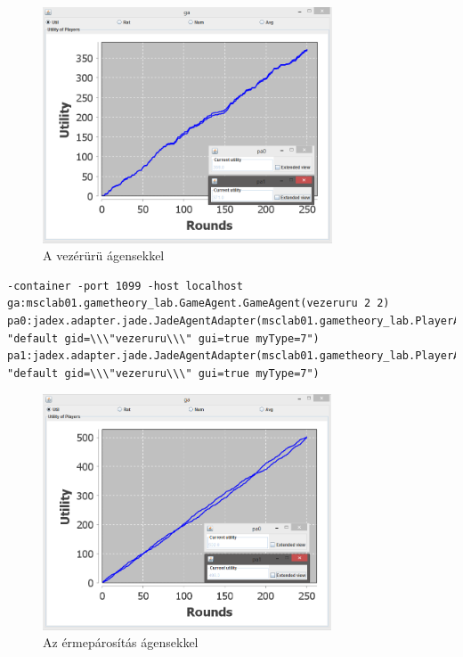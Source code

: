 		\begin{figure}[h]
		\begin{center}
		\includegraphics[height=7cm]{figures/uru_jadex.png}
		\caption{A vezérürü ágensekkel}
		\end{center}
		\end{figure}

\begin{lstlisting}[caption=Vezérürü run config, frame=single,float=!ht]
-container -port 1099 -host localhost 
ga:msclab01.gametheory_lab.GameAgent.GameAgent(vezeruru 2 2) pa0:jadex.adapter.jade.JadeAgentAdapter(msclab01.gametheory_lab.PlayerAgent.Player 
"default gid=\\\"vezeruru\\\" gui=true myType=7") 
pa1:jadex.adapter.jade.JadeAgentAdapter(msclab01.gametheory_lab.PlayerAgent.Player 
"default gid=\\\"vezeruru\\\" gui=true myType=7")
\end{lstlisting}
		

		\begin{figure}[h]
		\begin{center}
		\includegraphics[height=7cm]{figures/erme_jadex.png}
		\caption{Az érmepárosítás ágensekkel}
		\end{center}
		\end{figure}

